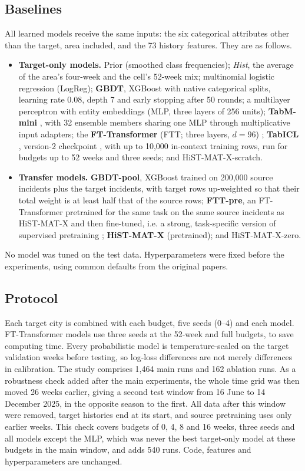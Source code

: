 \documentclass[11pt]{article}
\newcommand{\HMX}{HiST-MAT-X}
\begin{document}
\subsection{Baselines}
All learned models receive the same inputs: the six categorical attributes other than the target, area included, and the 73 history features. They are as follows.
\begin{itemize}
\item \textbf{Target-only models.} Prior (smoothed class frequencies); \emph{Hist}, the average of the area's four-week and the cell's 52-week mix; multinomial logistic regression (LogReg); \textbf{GBDT}, XGBoost \citep{chen2016xgboost} with native categorical splits, learning rate 0.08, depth 7 and early stopping after 50 rounds; a multilayer perceptron with entity embeddings (MLP, three layers of 256 units); \textbf{TabM-mini} \citep{gorishniy2025}, with 32 ensemble members sharing one MLP through multiplicative input adapters; the \textbf{FT-Transformer} (FTT; three layers, $d=96$) \citep{gorishniy2021}; \textbf{TabICL} \citep{qu2025tabicl}, version-2 checkpoint \citep{qu2026tabiclv2}, with up to 10,000 in-context training rows, run for budgets up to 52 weeks and three seeds; and \HMX{}-scratch.
\item \textbf{Transfer models.} \textbf{GBDT-pool}, XGBoost trained on 200,000 source incidents plus the target incidents, with target rows up-weighted so that their total weight is at least half that of the source rows; \textbf{FTT-pre}, an FT-Transformer pretrained for the same task on the same source incidents as \HMX{} and then fine-tuned, i.e. a strong, task-specific version of supervised pretraining \citep{levin2023}; \textbf{\HMX{}} (pretrained); and \HMX{}-zero.
\end{itemize}
No model was tuned on the test data. Hyperparameters were fixed before the experiments, using common defaults from the original papers.

\subsection{Protocol}
Each target city is combined with each budget, five seeds (0--4) and each model. FT-Transformer models use three seeds at the 52-week and full budgets, to save computing time. Every probabilistic model is temperature-scaled on the target validation weeks \citep{guo2017} before testing, so log-loss differences are not merely differences in calibration. The study comprises 1,464 main runs and 162 ablation runs. As a robustness check added after the main experiments, the whole time grid was then moved 26 weeks earlier, giving a second test window from 16 June to 14 December 2025, in the opposite season to the first. All data after this window were removed, target histories end at its start, and source pretraining uses only earlier weeks. This check covers budgets of 0, 4, 8 and 16 weeks, three seeds and all models except the MLP, which was never the best target-only model at these budgets in the main window, and adds 540 runs. Code, features and hyperparameters are unchanged.
\end{document}
